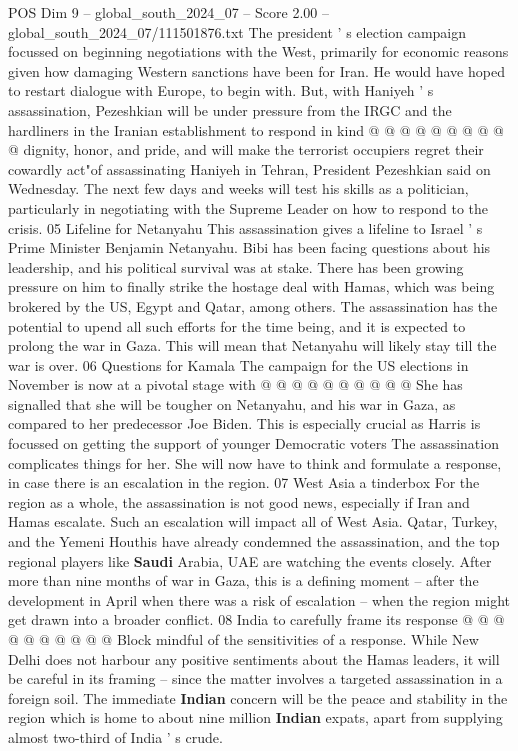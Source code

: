 \begin{textsample}{POS Dim 9 – global\_south\_2024\_07 – Score 2.00 – global\_south\_2024\_07/111501876.txt}
The president ' s election campaign focussed on beginning negotiations with the West, primarily for economic reasons given how damaging Western sanctions have been for Iran.
He would have hoped to restart dialogue with Europe, to begin with.
But, with Haniyeh ' s assassination, Pezeshkian will be under pressure from the IRGC and the hardliners in the Iranian establishment to respond in kind @ @ @ @ @ @ @ @ @ @ dignity, honor, and pride, and will make the terrorist occupiers regret their cowardly act"of assassinating Haniyeh in Tehran, President Pezeshkian said on Wednesday.
The next few days and weeks will test his skills as a politician, particularly in negotiating with the Supreme Leader on how to respond to the crisis. 05 Lifeline for Netanyahu This assassination gives a lifeline to Israel ' s Prime Minister Benjamin Netanyahu.
Bibi has been facing questions about his leadership, and his political survival was at stake.
There has been growing pressure on him to finally strike the hostage deal with Hamas, which was being brokered by the US, Egypt and Qatar, among others.
The assassination has the potential to upend all such efforts for the time being, and it is expected to prolong the war in Gaza.
This will mean that Netanyahu will likely stay till the war is over. 06 Questions for Kamala The campaign for the US elections in November is now at a pivotal stage with @ @ @ @ @ @ @ @ @ @ She has signalled that she will be tougher on Netanyahu, and his war in Gaza, as compared to her predecessor Joe Biden.
This is especially crucial as Harris is focussed on getting the support of younger Democratic voters The assassination complicates things for her.
She will now have to think and formulate a response, in case there is an escalation in the region. 07 West Asia a tinderbox For the region as a whole, the assassination is not good news, especially if Iran and Hamas escalate.
Such an escalation will impact all of West Asia.
Qatar, Turkey, and the Yemeni Houthis have already condemned the assassination, and the top regional players like \textbf{Saudi} Arabia, UAE are watching the events closely.
After more than nine months of war in Gaza, this is a defining moment -- after the development in April when there was a risk of escalation -- when the region might get drawn into a broader conflict. 08 India to carefully frame its response @ @ @ @ @ @ @ @ @ @ Block mindful of the sensitivities of a response.
While New Delhi does not harbour any positive sentiments about the Hamas leaders, it will be careful in its framing -- since the matter involves a targeted assassination in a foreign soil.
The immediate \textbf{Indian} concern will be the peace and stability in the region which is home to about nine million \textbf{Indian} expats, apart from supplying almost two-third of India ' s crude.

\end{textsample}
